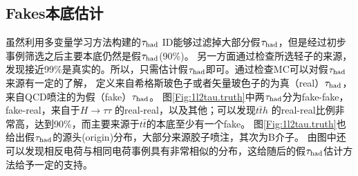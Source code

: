 \subsection{Fakes本底估计}\label{subsec:fakes_tau}
虽然利用多变量学习方法构建的$\tau_{\text{had}}$ ID能够过滤掉大部分假$\tau_{\text{had}}$，但是\ltwotau 经过初步事例筛选之后主要本底仍然是假$\tau_{\text{had}}$(90\%)。
另一方面通过检查所选轻子的来源，发现接近99\%是真实的。所以，只需估计假$\tau_{\text{had}}$即可。通过检查MC可以对假$\tau_{\text{had}}$来源有一定的了解，
定义来自希格斯玻色子或者矢量玻色子的为真（real）$\tau_{\text{had}}$，来自QCD喷注的为假（fake）$\tau_{\text{had}}$。
图\ref{Fig:1l2tau.truth}中两$\tau_{\text{had}}$分为fake-fake，fake-real，来自于$H\rightarrow \tau\tau$
的real-real，以及其他；可以发现$t \bar{t}h$ 的real-real比例非常高，达到90\%，而主要来源于$t\bar{t}$的本底至少有一个fake。
图\ref{Fig:1l2tau.truth}也给出假$\tau_{\text{had}}$的源头(origin)分布，大部分来源胶子喷注，其次为B介子。
由图中还可以发现相反电荷与相同电荷事例具有非常相似的分布，这给随后的假$\tau_{\text{had}}$估计方法给予一定的支持。
